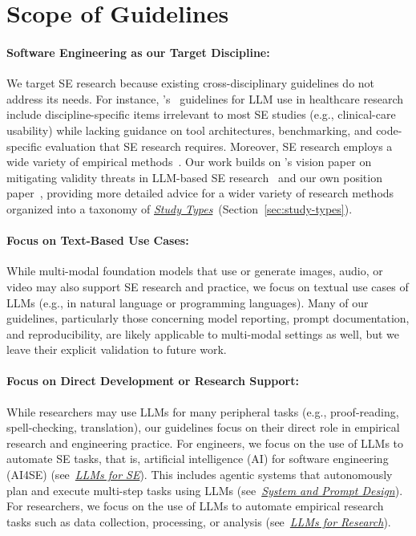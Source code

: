 \documentclass[smallextended]{svjour3}
\newif\ifpaper\papertrue
\newcommand{\studytypes}{\hyperref[sec:study-types]{\emph{Study Types}}\xspace}
\newcommand{\llmsforresearcher}{\hyperref[sec:llms-as-tools-for-software-engineering-researchers]{\emph{LLMs for Research}}\xspace}
\newcommand{\llmsforengineers}{\hyperref[sec:llms-as-tools-for-software-engineers]{\emph{LLMs for SE}}\xspace}
\newcommand{\studytypes}{\href{/study-types}{\emph{Study Types}}\xspace}
\newcommand{\llmsforresearcher}{\href{/study-types/\#introduction-llms-as-tools-for-software-engineering-researchers}{\emph{LLMs for Research}}\xspace}
\newcommand{\llmsforengineers}{\href{/study-types/\#introduction-llms-as-tools-for-software-engineers}{\emph{LLMs for SE}}\xspace}
\newcommand{\design}{\hyperref[sec:report-system-and-prompt-design]{\emph{System and Prompt Design}}\xspace}
\newcommand{\design}{\href{/guidelines\#report-system-and-prompt-design}{\emph{System and Prompt Design}}\xspace}
\newcommand{\scopeparagraph}[1]{\paragraph{\bfseries #1:}}
\newcommand{\scopeparagraph}[1]{\subsubsection{#1}}
\begin{document}
\section{Scope of Guidelines}
\label{sec:scope}

\scopeparagraph{Software Engineering as our Target Discipline}

We target SE research because existing cross-disciplinary guidelines do not address its needs. For instance, \citeauthor{Gallifant2025}'s~\cite{Gallifant2025} guidelines for LLM use in healthcare research include discipline-specific items irrelevant to most SE studies (e.g., clinical-care usability) while lacking guidance on tool architectures, benchmarking, and code-specific evaluation that SE research requires.
Moreover, SE research employs a wide variety of empirical methods~\cite{ralph2021empiricalstandardssoftwareengineering, DBLP:books/sp/WohlinRHORW24}. Our work builds on \citeauthor{DBLP:conf/icse/SallouDP24}'s vision paper on mitigating validity threats in LLM-based SE research~\cite{DBLP:conf/icse/SallouDP24} and our own position paper~\cite{DBLP:conf/wsese/0001BFB25}, providing more detailed advice for a wider variety of research methods organized into a taxonomy of \studytypes\ifpaper~(Section~\ref{sec:study-types})\fi.

\scopeparagraph{Focus on Text-Based Use Cases}

While multi-modal foundation models that use or generate images, audio, or video may also support SE research and practice, we focus on textual use cases of LLMs (e.g., in natural language or programming languages). Many of our guidelines, particularly those concerning model reporting, prompt documentation, and reproducibility, are likely applicable to multi-modal settings as well, but we leave their explicit validation to future work.

\scopeparagraph{Focus on Direct Development or Research Support}

While researchers may use LLMs for many peripheral tasks (e.g., proof-reading, spell-checking, translation), our guidelines focus on their direct role in empirical research and engineering practice.
For engineers, we focus on the use of LLMs to automate SE tasks, that is, artificial intelligence (AI) for software engineering (AI4SE) (see~\llmsforengineers).
This includes agentic systems that autonomously plan and execute multi-step tasks using LLMs (see~\design).
For researchers, we focus on the use of LLMs to automate empirical research tasks such as data collection, processing, or analysis (see~\llmsforresearcher).
\end{document}
